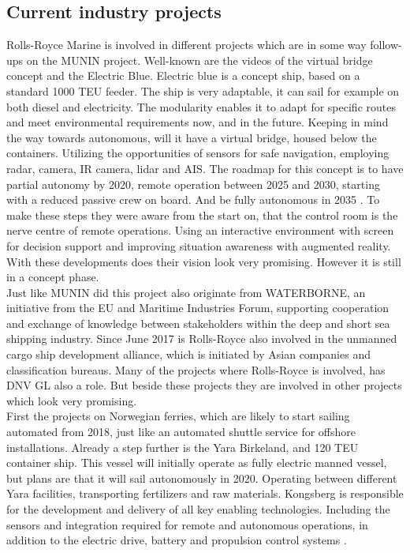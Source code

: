 \subsection{Current industry projects}
Rolls-Royce Marine is involved in different projects which are in some way follow-ups on the MUNIN project. Well-known are the videos of the virtual bridge concept and the Electric Blue. Electric blue is a concept ship, based on a standard 1000 \ac{TEU} feeder. The ship is very adaptable, it can sail for example on both diesel and electricity. The modularity enables it to adapt for specific routes and meet environmental requirements now, and in the future. 
Keeping in mind the way towards autonomous, will it have a virtual bridge, housed below the containers. Utilizing the opportunities of sensors for safe navigation, employing radar, camera, IR camera, lidar and \ac{AIS}. The roadmap for this concept is to have partial autonomy by 2020, remote operation between 2025 and 2030, starting with a reduced passive crew on board. And be fully autonomous in 2035 \cite{Wilson2017}. 
To make these steps they were aware from the start on, that the control room is the nerve centre of remote operations. Using an interactive environment with screen for decision support and improving situation awareness with augmented reality. With these developments does their vision look very promising. However it is still in a concept phase.\\

Just like MUNIN did this project also originate from WATERBORNE, an initiative from the EU and Maritime Industries Forum, supporting cooperation and exchange of knowledge between stakeholders within the deep and short sea shipping industry. Since June 2017 is Rolls-Royce also involved in the unmanned cargo ship development alliance, which is initiated by Asian companies and classification bureaus. Many of the projects where Rolls-Royce is involved, has DNV GL also a role. But beside these projects they are involved in other projects which look very promising.\\

First the projects on Norwegian ferries, which are likely to start sailing automated from 2018, just like an automated shuttle service for offshore installations. 
Already a step further is the Yara Birkeland, and 120 \ac{TEU} container ship. This vessel will initially operate as fully electric manned vessel, but plans are that it will sail autonomously in 2020. Operating between different Yara facilities, transporting fertilizers and raw materials. 
Kongsberg is responsible for the development and delivery of all key enabling technologies. Including the sensors and integration required for remote and autonomous operations, in addition to the electric drive, battery and propulsion control systems \cite{Sames2017}. \\

